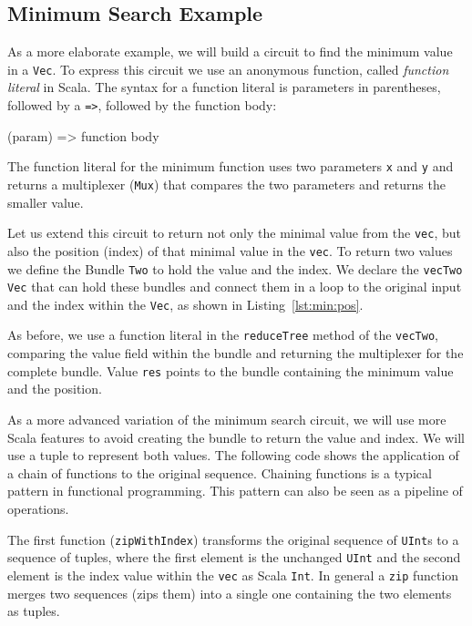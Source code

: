 \documentclass[%
    10pt,
    headinclude, footexclude,
    openright, %
    notitlepage,
    cleardoubleempty,
    headsepline,
    pointlessnumbers,
    bibtotoc, idxtotoc,
    ]{scrbook}
\newcommand{\code}[1]{{\small{\texttt{#1}}}}
\begin{document}

\subsection{Minimum Search Example}

As a more elaborate example, we will build a circuit to find the minimum value in a \code{Vec}. To express this circuit
we use an anonymous function, called \emph{function literal} in Scala.  The syntax for a function
literal is parameters in parentheses, followed by a \code{=>}, followed by the function body:

\begin{chisel}
  (param) => function body
\end{chisel}

The function literal for the minimum function uses two parameters \code{x} and \code{y}
and returns a multiplexer (\code{Mux}) that compares the two parameters and returns the smaller
value.


Let us extend this circuit to return not only the minimal value from the \code{vec}, but also the
position (index) of that minimal value in the \code{vec}. To return two values we define the Bundle \code{Two} to
hold the value and the index. We declare the \code{vecTwo} \code{Vec} that can hold these bundles
and connect them in a loop to the original input and the index within the \code{Vec}, as shown
in Listing~\ref{lst:min:pos}.

As before, we use a function literal in the \code{reduceTree} method of the \code{vecTwo},
comparing the value field within the bundle and returning the multiplexer for the
complete bundle.
Value \code{res} points to the bundle containing the minimum value and the position.



As a more advanced variation of the minimum search circuit, we will use more Scala features
to avoid creating the bundle to return the value
and index. We will use a tuple to represent both values.
The following code shows the application
of a chain of functions to the original sequence. Chaining functions is a typical pattern in functional programming.
This pattern can also be seen as a pipeline of operations.


The first function (\code{zipWithIndex})
transforms the original sequence of \code{UInt}s to a sequence of tuples, where the first element is the
unchanged \code{UInt} and the second element is the index value within the \code{vec} as Scala \code{Int}.
In general a \code{zip} function merges two sequences (zips them) into a single one
containing the two elements as tuples.
\end{document}
